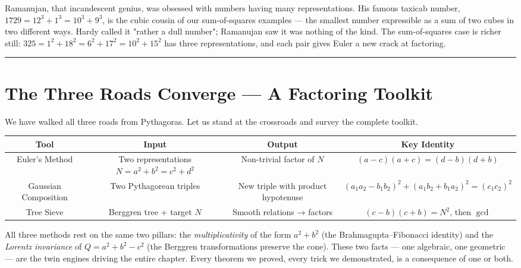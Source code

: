 \documentclass[11pt,openany]{book}
\theoremstyle{definition}
\theoremstyle{plain}
\theoremstyle{remark}
\begin{document}
Ramanujan, that incandescent genius, was obsessed with numbers having many representations. His famous taxicab number, $1729 = 12^3 + 1^3 = 10^3 + 9^3$, is the cubic cousin of our sum-of-squares examples — the smallest number expressible as a sum of two cubes in two different ways. Hardy called it "rather a dull number"; Ramanujan saw it was nothing of the kind. The sum-of-squares case is richer still: $325 = 1^2 + 18^2 = 6^2 + 17^2 = 10^2 + 15^2$ has three representations, and each pair gives Euler a new crack at factoring.

\bigskip\noindent\rule{\textwidth}{0.4pt}\bigskip


\section*{The Three Roads Converge — A Factoring Toolkit}


We have walked all three roads from Pythagoras. Let us stand at the crossroads and survey the complete toolkit.

\begin{center}
\begin{tabular}{c|c|c|c}
\toprule
\textbf{Tool} & \textbf{Input} & \textbf{Output} & \textbf{Key Identity} \\
\midrule
Euler's Method & Two representations $N = a^2 + b^2 = c^2 + d^2$ & Non-trivial factor of $N$ & $(a - c)(a + c) = (d - b)(d + b)$ \\
Gaussian Composition & Two Pythagorean triples & New triple with product hypotenuse & $(a_1 a_2 - b_1 b_2)^2 + (a_1 b_2 + b_1 a_2)^2 = (c_1 c_2)^2$ \\
Tree Sieve & Berggren tree + target $N$ & Smooth relations → factors & $(c - b)(c + b) = N^2$, then $\gcd$ \\
\bottomrule
\end{tabular}
\end{center}


All three methods rest on the same two pillars: the \textit{multiplicativity} of the form $a^2 + b^2$ (the Brahmagupta–Fibonacci identity) and the \textit{Lorentz invariance} of $Q = a^2 + b^2 - c^2$ (the Berggren transformations preserve the cone). These two facts — one algebraic, one geometric — are the twin engines driving the entire chapter. Every theorem we proved, every trick we demonstrated, is a consequence of one or both.
\end{document}
